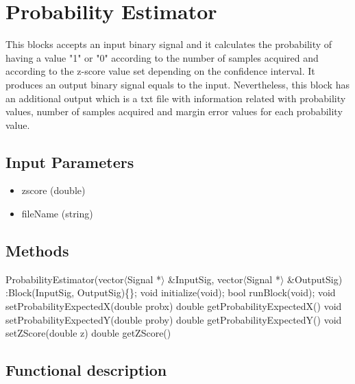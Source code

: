 \clearpage

\section{Probability Estimator}

\maketitle

This blocks accepts an input binary signal and it calculates the probability of having a value "1" \space or "0" \space according to the number of samples acquired and according to the z-score value set depending on the confidence interval. It produces an output binary signal equals to the input. Nevertheless, this block has an additional output which is a txt file with information related with probability values, number of samples acquired and margin error values for each probability value.

\subsection*{Input Parameters}

	\begin{itemize}
		\item zscore \linebreak
		(double)
    \item fileName \linebreak
		(string)
	
	\end{itemize}

\subsection*{Methods}

ProbabilityEstimator(vector$\langle$Signal *$\rangle$ \&InputSig, vector$\langle$Signal *$\rangle$ \&OutputSig) :Block(InputSig, OutputSig)\{\};
\bigbreak	
void initialize(void);
\bigbreak	
bool runBlock(void);
\bigbreak	
void setProbabilityExpectedX(double probx)
double getProbabilityExpectedX()
\bigbreak	
void setProbabilityExpectedY(double proby)
double getProbabilityExpectedY()
\bigbreak
void setZScore(double z)
double getZScore()


\subsection*{Functional description}

